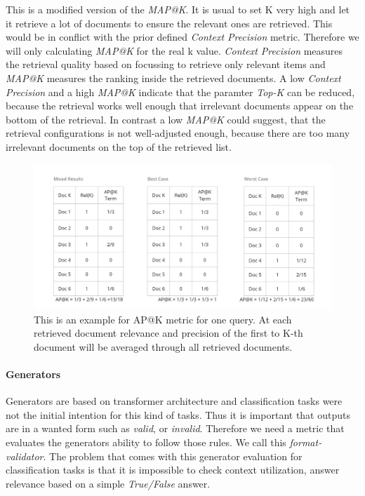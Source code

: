 This is a modified version of the \textit{MAP@K}.\cite{Lin.13.10.2020} It is usual to set K very high and let it retrieve a lot of documents to ensure the relevant ones are retrieved. This would be in conflict with the prior defined \textit{Context Precision} metric. Therefore we will only calculating \textit{MAP@K} for the real k value. \textit{Context Precision} measures the retrieval quality based on focussing to retrieve only relevant items and \textit{MAP@K} measures the ranking inside the retrieved documents. A low \textit{Context Precision} and a high \textit{MAP@K} indicate that the paramter \textit{Top-K} can be reduced, because the retrieval works well enough that irrelevant documents appear on the bottom of the retrieval. In contrast a low \textit{MAP@K} could suggest, that the retrieval configurations is not well-adjusted enough, because there are too many irrelevant documents on the top of the retrieved list.

\begin{figure}
  \centering
  \includegraphics[width=\textwidth]{images/APatK.pdf}
  \caption{This is an example for AP@K metric for one query. At each retrieved document relevance and precision of the first to K-th document will be averaged through all retrieved documents.}
  \label{fig:APatK}
\end{figure}


\paragraph{Generators}
Generators are based on transformer architecture and classification tasks were not the initial intention for this kind of tasks. Thus it is important that outputs are in a wanted form such as \textit{valid}, or \textit{invalid}. Therefore we need a metric that evaluates the generators ability to follow those rules. We call this \textit{format-validator}. The problem that comes with this generator evaluation for classification tasks is that it is impossible to check context utilization, answer relevance based on a simple \textit{True/False} answer. 

